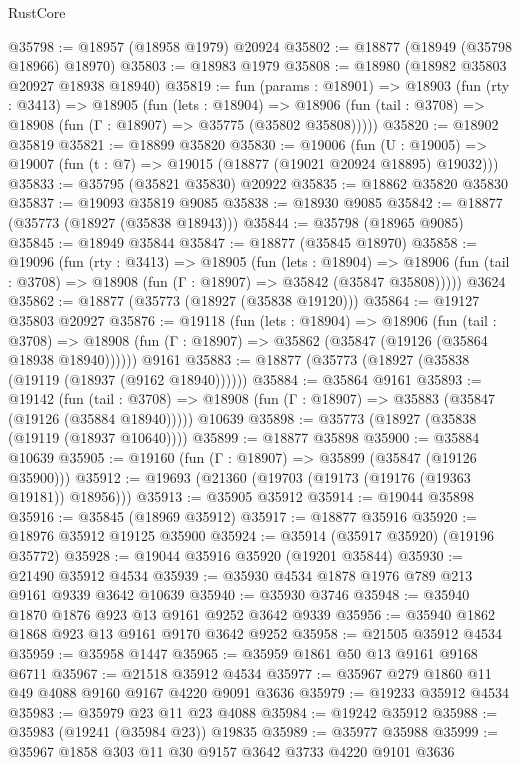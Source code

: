 \begin{lexlean}{RustCore}
\begin{coremodule}
@35798 := @18957 (@18958 @1979) @20924
@35802 := @18877 (@18949 (@35798 @18966) @18970)
@35803 := @18983 @1979
@35808 := @18980 (@18982 @35803 @20927 @18938 @18940)
@35819 := fun (params : @18901) =>
  @18903
    (fun (rty : @3413) =>
    @18905
      (fun (lets : @18904) =>
      @18906 (fun (tail : @3708) => @18908 (fun (Γ : @18907) => @35775 (@35802 @35808)))))
@35820 := @18902 @35819
@35821 := @18899 @35820
@35830 := @19006
    (fun (U : @19005) => @19007 (fun (t : @7) => @19015 (@18877 (@19021 @20924 @18895) @19032)))
@35833 := @35795 (@35821 @35830) @20922
@35835 := @18862 @35820 @35830
@35837 := @19093 @35819 @9085
@35838 := @18930 @9085
@35842 := @18877 (@35773 (@18927 (@35838 @18943)))
@35844 := @35798 (@18965 @9085)
@35845 := @18949 @35844
@35847 := @18877 (@35845 @18970)
@35858 := @19096
    (fun (rty : @3413) =>
    @18905
      (fun (lets : @18904) =>
      @18906 (fun (tail : @3708) => @18908 (fun (Γ : @18907) => @35842 (@35847 @35808)))))
    @3624
@35862 := @18877 (@35773 (@18927 (@35838 @19120)))
@35864 := @19127 @35803 @20927
@35876 := @19118
    (fun (lets : @18904) =>
    @18906
      (fun (tail : @3708) =>
      @18908 (fun (Γ : @18907) => @35862 (@35847 (@19126 (@35864 @18938 @18940))))))
    @9161
@35883 := @18877 (@35773 (@18927 (@35838 (@19119 (@18937 (@9162 @18940))))))
@35884 := @35864 @9161
@35893 := @19142
    (fun (tail : @3708) => @18908 (fun (Γ : @18907) => @35883 (@35847 (@19126 (@35884 @18940)))))
    @10639
@35898 := @35773 (@18927 (@35838 (@19119 (@18937 @10640))))
@35899 := @18877 @35898
@35900 := @35884 @10639
@35905 := @19160 (fun (Γ : @18907) => @35899 (@35847 (@19126 @35900)))
@35912 := @19693 (@21360 (@19703 (@19173 (@19176 (@19363 @19181)) @18956)))
@35913 := @35905 @35912
@35914 := @19044 @35898
@35916 := @35845 (@18969 @35912)
@35917 := @18877 @35916
@35920 := @18976 @35912 @19125 @35900
@35924 := @35914 (@35917 @35920) (@19196 @35772)
@35928 := @19044 @35916 @35920 (@19201 @35844)
@35930 := @21490 @35912 @4534
@35939 := @35930 @4534 @1878 @1976 @789 @213 @9161 @9339 @3642 @10639
@35940 := @35930 @3746
@35948 := @35940 @1870 @1876 @923 @13 @9161 @9252 @3642 @9339
@35956 := @35940 @1862 @1868 @923 @13 @9161 @9170 @3642 @9252
@35958 := @21505 @35912 @4534
@35959 := @35958 @1447
@35965 := @35959 @1861 @50 @13 @9161 @9168 @6711
@35967 := @21518 @35912 @4534
@35977 := @35967 @279 @1860 @11 @49 @4088 @9160 @9167 @4220 @9091 @3636
@35979 := @19233 @35912 @4534
@35983 := @35979 @23 @11 @23 @4088
@35984 := @19242 @35912
@35988 := @35983 (@19241 (@35984 @23)) @19835
@35989 := @35977 @35988
@35999 := @35967 @1858 @303 @11 @30 @9157 @3642 @3733 @4220 @9101 @3636

\end{coremodule}
\end{lexlean}
